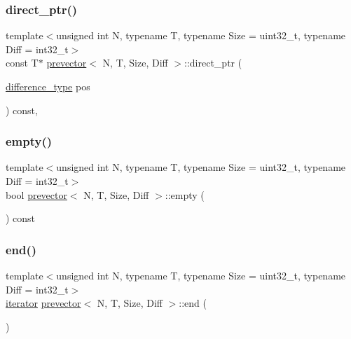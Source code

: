 \mbox{\label{classprevector_a6b64218000ca976867bc26d9ae1de8f8}} 
\subsubsection{\texorpdfstring{direct\+\_\+ptr()}{direct\_ptr()}\hspace{0.1cm}{\footnotesize\ttfamily [2/2]}}
{\footnotesize\ttfamily template$<$unsigned int N, typename T, typename Size = uint32\+\_\+t, typename Diff = int32\+\_\+t$>$ \\
const T$\ast$ \mbox{\hyperlink{classprevector}{prevector}}$<$ N, T, Size, Diff $>$\+::direct\+\_\+ptr (\begin{DoxyParamCaption}\item[{\mbox{\hyperlink{classprevector_a34ad7f610eefb33a8db9161cadf15dbe}{difference\+\_\+type}}}]{pos }\end{DoxyParamCaption}) const\hspace{0.3cm}{\ttfamily [inline]}, {\ttfamily [private]}}

\mbox{\label{classprevector_a0057a2d5ac2bbff636af5fbd87ae5235}} 
\subsubsection{\texorpdfstring{empty()}{empty()}}
{\footnotesize\ttfamily template$<$unsigned int N, typename T, typename Size = uint32\+\_\+t, typename Diff = int32\+\_\+t$>$ \\
bool \mbox{\hyperlink{classprevector}{prevector}}$<$ N, T, Size, Diff $>$\+::empty (\begin{DoxyParamCaption}{ }\end{DoxyParamCaption}) const\hspace{0.3cm}{\ttfamily [inline]}}

\mbox{\label{classprevector_aab7f6e13a3cac85cc340fc6b90c5365c}} 
\subsubsection{\texorpdfstring{end()}{end()}\hspace{0.1cm}{\footnotesize\ttfamily [1/2]}}
{\footnotesize\ttfamily template$<$unsigned int N, typename T, typename Size = uint32\+\_\+t, typename Diff = int32\+\_\+t$>$ \\
\mbox{\hyperlink{classprevector_1_1iterator}{iterator}} \mbox{\hyperlink{classprevector}{prevector}}$<$ N, T, Size, Diff $>$\+::end (\begin{DoxyParamCaption}{ }\end{DoxyParamCaption})\hspace{0.3cm}{\ttfamily [inline]}}

